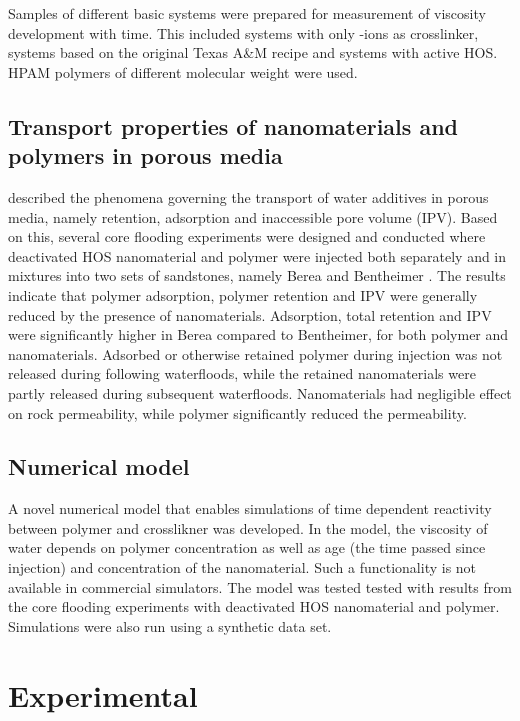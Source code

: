 \documentclass[energies,article,submit,moreauthors,pdftex]{Definitions/mdpi}
\begin{document}
Samples of different basic systems were prepared for measurement of viscosity development with time. This included systems with only -ions as crosslinker, systems based on the original Texas A\&M recipe \citep{Cordova2008} and systems with active HOS. HPAM polymers of different molecular weight were used.
    
\subsection{Transport properties of nanomaterials and polymers in porous media}
\citet{Lotsch1985} described the phenomena governing the transport of water additives in porous media, namely retention, adsorption and inaccessible pore volume (IPV). Based on this, several core flooding experiments were designed and conducted where deactivated HOS nanomaterial and polymer were injected both separately and in mixtures into two sets of sandstones, namely Berea and Bentheimer \citep{Najafiazar2016}. The results indicate that polymer adsorption, polymer retention and IPV were generally reduced by the presence of nanomaterials. Adsorption, total retention and IPV were significantly higher in Berea compared to Bentheimer, for both polymer and nanomaterials. Adsorbed or otherwise retained polymer during injection was not released during following waterfloods, while the retained nanomaterials were partly released during subsequent waterfloods. Nanomaterials had negligible effect on rock permeability, while polymer significantly reduced the permeability.

\subsection{Numerical model}

A novel numerical model that enables simulations of time dependent reactivity between polymer and crosslikner was developed. In the model, the viscosity of water depends on polymer concentration as well as age (the time passed since injection) and concentration of the nanomaterial. Such a functionality is not available in commercial simulators. The model was tested tested with results from the core flooding experiments with deactivated HOS nanomaterial and polymer. Simulations were also run using a synthetic data set.
 
\section{Experimental}
\end{document}
